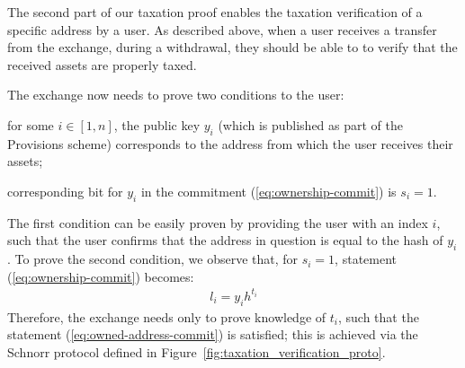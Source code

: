 The second part of our taxation proof enables the taxation verification of a
specific address by a user. As described above, when a user receives a transfer
from the exchange, \eg during a withdrawal, they should be able to to verify
that the received assets are properly taxed.

The exchange now needs to prove two conditions to the user:
\begin{inparaenum}[i)]
    \item for some $i \in [1, n]$, the public key $y_i$ (which is published as
        part of the Provisions scheme) corresponds to the address from which
        the user receives their assets;
    \item corresponding bit for $y_i$ in the commitment
        (\ref{eq:ownership-commit}) is $s_i = 1$.
\end{inparaenum}
The first condition can be easily proven by providing the user with an index
$i$, such that the user confirms that the address in question is equal to the
hash of $y_i$. To prove the second condition, we observe that, for $s_i = 1$,
statement (\ref{eq:ownership-commit}) becomes:
\begin{align}
    l_i = y_ih^{t_i} \label{eq:owned-address-commit}
\end{align}
Therefore, the exchange needs only to prove knowledge of $t_i$, such that the
statement (\ref{eq:owned-address-commit}) is satisfied; this is achieved via
the Schnorr protocol defined in Figure~\ref{fig:taxation_verification_proto}.

